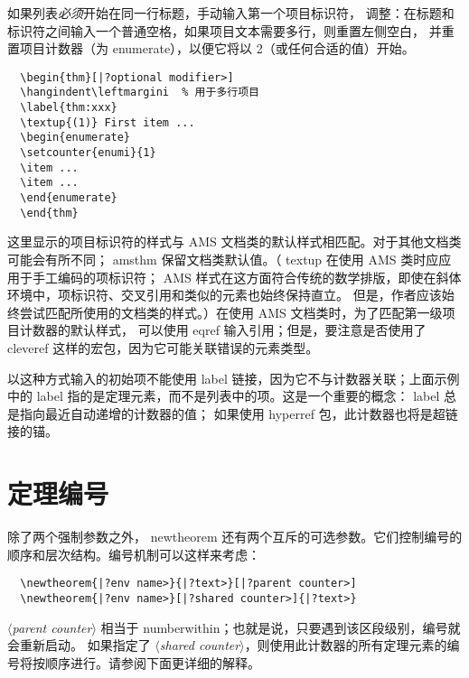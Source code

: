 \documentclass{article}
\newcommand{\ntt}{%
  \fontfamily\ttdefault \fontseries\mddefault \fontshape\updefault
  \selectfont
}
\DeclareRobustCommand{\cn}[1]{{\ntt\bslchar#1}}
\DeclareRobustCommand{\pkg}[1]{\textsf{#1}}
\DeclareRobustCommand{\env}[1]{{\ntt#1}}
\def\<#1>{{\normalfont$\langle$\textit{#1}$\rangle$}}
\begin{document}
如果列表\emph{必须}开始在同一行标题，手动输入第一个项目标识符，
调整：在标题和标识符之间输入一个普通空格，如果项目文本需要多行，则重置左侧空白，
并重置项目计数器（为 \env{enumerate}），以便它将以 2（或任何合适的值）开始。
\begin{verbatim}
  \begin{thm}[|?optional modifier>]
  \hangindent\leftmargini  % 用于多行项目
  \label{thm:xxx}
  \textup{(1)} First item ...
  \begin{enumerate}
  \setcounter{enumi}{1}
  \item ...
  \item ...
  \end{enumerate}
  \end{thm}
\end{verbatim}
这里显示的项目标识符的样式与 AMS 文档类的默认样式相匹配。对于其他文档类可能会有所不同；
\pkg{amsthm} 保留文档类默认值。（\cn{textup} 在使用 AMS 类时应应用于手工编码的项标识符；
AMS 样式在这方面符合传统的数学排版，即使在斜体环境中，项标识符、交叉引用和类似的元素也始终保持直立。
但是，作者应该始终尝试匹配所使用的文档类的样式。）在使用 AMS 文档类时，为了匹配第一级项目计数器的默认样式，
可以使用 \cn{eqref} 输入引用；但是，要注意是否使用了 \pkg{cleveref} 这样的宏包，因为它可能关联错误的元素类型。

以这种方式输入的初始项不能使用 \cn{label} 链接，因为它不与计数器关联；上面示例中的 \cn{label} 
指的是定理元素，而不是列表中的项。这是一个重要的概念：\cn{label} 总是指向最近自动递增的计数器的值；
如果使用 \pkg{hyperref} 包，此计数器也将是超链接的锚。




\enlargethispage{1\baselineskip} %

\section{定理编号}

除了两个强制参数之外，\cn{newtheorem} 还有两个互斥的可选参数。它们控制编号的顺序和层次结构。编号机制可以这样来考虑：
\begin{verbatim}
  \newtheorem{|?env name>}{|?text>}[|?parent counter>]
  \newtheorem{|?env name>}[|?shared counter>]{|?text>}
\end{verbatim}
\<parent counter> 相当于 \cn{numberwithin}；也就是说，只要遇到该区段级别，编号就会重新启动。
如果指定了 \<shared counter>，则使用此计数器的所有定理元素的编号将按顺序进行。请参阅下面更详细的解释。
\end{document}
